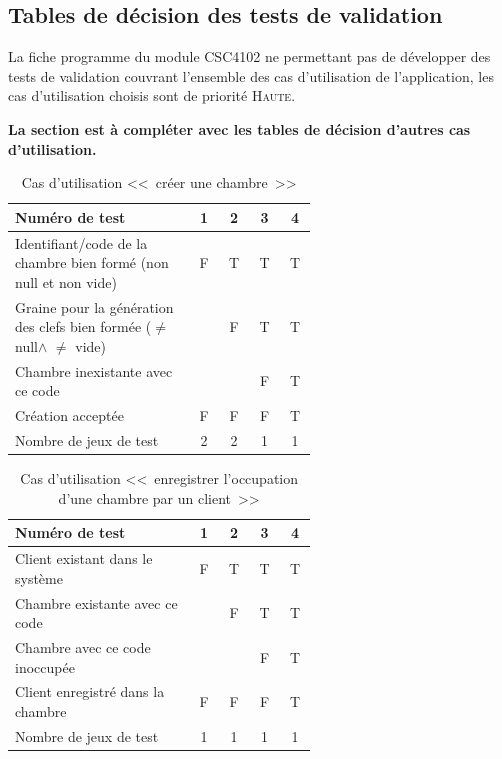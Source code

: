 \documentclass[11pt,article]{article}
\newcommand{\nullvalue}{\textsf{null}\xspace}
\begin{document}
\subsection{Tables de décision des tests de validation}

La fiche programme du module CSC4102 ne permettant pas de développer
des tests de validation couvrant l'ensemble des cas d'utilisation de
l'application, les cas d'utilisation choisis sont de priorité
\textsc{Haute}.

{\color{red}\textbf{La section est à compléter avec les tables de
    décision d'autres cas d'utilisation.}}

\begin{table}[htbp!]
\begin{tabular}{|p{0.6\linewidth}|c|c|c|c|}
\hline
Numéro de test
&1&2&3&4\\
\hline
\hline
Identifiant/code de la chambre bien formé (non \nullvalue et non vide)
&F&T&T&T\\
\hline
Graine pour la génération des clefs bien formée ($\neq$ \nullvalue $\land$ $\neq$ vide)
& &F&T&T\\
\hline
Chambre inexistante avec ce code
& & &F&T\\
\hline
\hline
Création acceptée
&F&F&F&T\\
\hline
\hline
Nombre de jeux de test
&2&2&1&1\\
\hline
\end{tabular}
\caption{Cas d'utilisation <<~créer une chambre~>>}
\end{table}

\begin{table}[htbp!]
\begin{tabular}{|p{0.6\linewidth}|c|c|c|c|}
\hline
Numéro de test
&1&2&3&4\\
\hline
\hline
Client existant dans le système
&F&T&T&T\\
\hline
Chambre existante avec ce code
& &F&T&T\\
\hline
Chambre avec ce code inoccupée
& & &F&T\\
\hline
\hline
Client enregistré dans la chambre
&F&F&F&T\\
\hline
\hline
Nombre de jeux de test
&1&1&1&1\\
\hline
\end{tabular}
\caption{Cas d'utilisation <<~enregistrer l'occupation d'une chambre par un client~>>}
\end{table}
\end{document}
